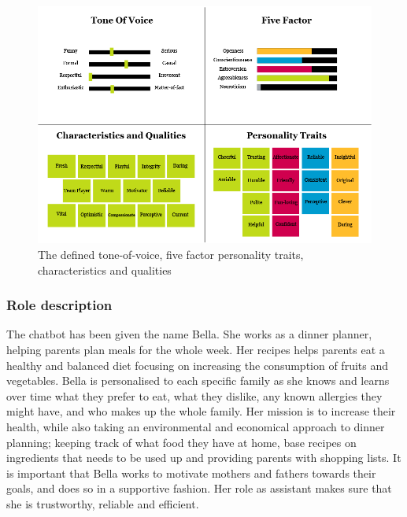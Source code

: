     \begin{figure}[h]
            \centering
            \includegraphics[scale=0.5]{figures/Defined_characteristics_and_traits.png}
            \caption{The defined tone-of-voice, five factor personality traits, characteristics and qualities}
            \label{fig:characteristics}
        \end{figure}
    
    \subsubsection{Role description}
    The chatbot has been given the name Bella. She works as a dinner planner, helping parents plan meals for the whole week. Her recipes helps parents eat a healthy and balanced diet focusing on increasing the consumption of fruits and vegetables. Bella is personalised to each specific family as she knows and learns over time what they prefer to eat, what they dislike, any known allergies they might have, and who makes up the whole family. Her mission is to increase their health, while also taking an environmental and economical approach to dinner planning; keeping track of what food they have at home, base recipes on ingredients that needs to be used up and providing parents with shopping lists. It is important that Bella works to motivate mothers and fathers towards their goals, and does so in a supportive fashion. Her role as assistant makes sure that she is trustworthy, reliable and efficient.
    
